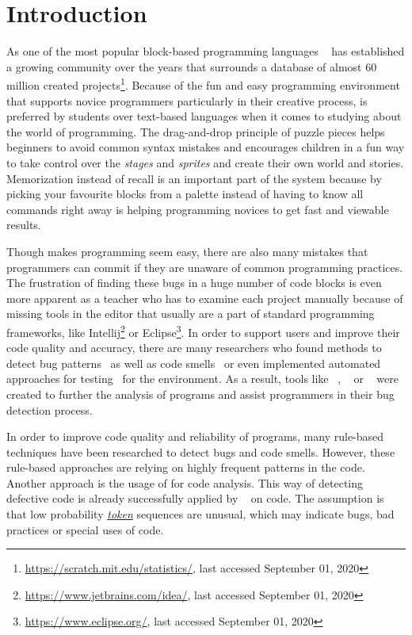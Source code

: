 \chapter{Introduction}\label{chap:introduction}

As one of the most popular block-based programming languages \scratch{}~\cite{scratch} has established a growing community over the years that surrounds a database of almost 60 million created projects\footnote{\url{https://scratch.mit.edu/statistics/}, last accessed September 01, 2020}. Because of the fun and easy programming environment that supports novice programmers particularly in their creative process, \scratch{} is preferred by students over text-based languages when it comes to studying about the world of programming. The drag-and-drop principle of puzzle pieces helps beginners to avoid common syntax mistakes and encourages children in a fun way to take control over the \textit{stages} and \textit{sprites} and create their own world and stories. Memorization instead of recall is an important part of the \scratch{} system because by picking your favourite blocks from a palette instead of having to know all commands right away is helping programming novices to get fast and viewable results. 

Though \scratch{} makes programming seem easy, there are also many mistakes that programmers can commit if they are unaware of common programming practices. The frustration of finding these bugs in a huge number of code blocks is even more apparent as a teacher who has to examine each project manually because of missing tools in the \scratch{} editor that usually are a part of standard programming frameworks, like Intellij\footnote{\url{https://www.jetbrains.com/idea/}, last accessed September 01, 2020} or Eclipse\footnote{\url{https://www.eclipse.org/}, last accessed September 01, 2020}. In order to support \scratch{} users and improve their code quality and accuracy, there are many researchers who found methods to detect bug patterns~\cite{scratch_bugpatterns} as well as code smells~\cite{badsmells, badhabits, hairball} or even implemented automated approaches for testing~\cite{whisker} for the \scratch{} environment. As a result, tools like \hairball~\cite{hairball}, \drscratch~\cite{drscratch} or \litterbox~\cite{scratch_bugpatterns} were created to further the analysis of \scratch{} programs and assist programmers in their bug detection process.

In order to improve code quality and reliability of programs, many rule-based techniques have been researched to detect bugs and code smells. However, these rule-based approaches are relying on highly frequent patterns in the code. Another approach is the usage of  for code analysis. This way of detecting defective code is already successfully applied by \bugram{}~\cite{bugram} on \java{} code. The assumption is that low probability \hyperref[def:token]{\textit{token}} sequences are unusual, which may indicate bugs, bad practices or special uses of code. 

